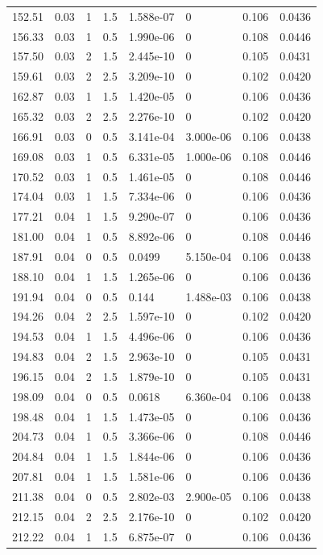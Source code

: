 \documentclass[preview]{standalone}
\begin{document}
{{{\begin{tabular}{L{1.2cm}C{1.2cm} C{0.3cm}C{0.5cm} C{1.4cm}C{1.4cm} C{1.4cm}C{1.4cm}}
  152.51  &  0.03  & 1     & 1.5 &  1.588e-07  & 0  & 0.106 &  0.0436   \\ 
  156.33  &  0.03  & 1     & 0.5 &  1.990e-06  & 0  & 0.108 &  0.0446   \\ 
  157.50  &  0.03  & 2     & 1.5 &  2.445e-10  & 0  & 0.105 &  0.0431   \\ 
  159.61  &  0.03  & 2     & 2.5 &  3.209e-10  & 0  & 0.102 &  0.0420   \\ 
  162.87  &  0.03  & 1     & 1.5 &  1.420e-05  & 0  & 0.106 &  0.0436   \\ 
  165.32  &  0.03  & 2     & 2.5 &  2.276e-10  & 0  & 0.102 &  0.0420   \\ 
  166.91  &  0.03  & 0     & 0.5 &  3.141e-04  & 3.000e-06  & 0.106 &  0.0438   \\ 
  169.08  &  0.03  & 1     & 0.5 &  6.331e-05  & 1.000e-06  & 0.108 &  0.0446   \\ 
  170.52  &  0.03  & 1     & 0.5 &  1.461e-05  & 0  & 0.108 &  0.0446   \\ 
  174.04  &  0.03  & 1     & 1.5 &  7.334e-06  & 0  & 0.106 &  0.0436   \\ 
  177.21  &  0.04  & 1     & 1.5 &  9.290e-07  & 0  & 0.106 &  0.0436   \\ 
  181.00  &  0.04  & 1     & 0.5 &  8.892e-06  & 0  & 0.108 &  0.0446   \\ 
  187.91  &  0.04  & 0     & 0.5 &  0.0499  & 5.150e-04  & 0.106 &  0.0438   \\ 
  188.10  &  0.04  & 1     & 1.5 &  1.265e-06  & 0  & 0.106 &  0.0436   \\ 
  191.94  &  0.04  & 0     & 0.5 &  0.144  & 1.488e-03  & 0.106 &  0.0438   \\ 
  194.26  &  0.04  & 2     & 2.5 &  1.597e-10  & 0  & 0.102 &  0.0420   \\ 
  194.53  &  0.04  & 1     & 1.5 &  4.496e-06  & 0  & 0.106 &  0.0436   \\ 
  194.83  &  0.04  & 2     & 1.5 &  2.963e-10  & 0  & 0.105 &  0.0431   \\ 
  196.15  &  0.04  & 2     & 1.5 &  1.879e-10  & 0  & 0.105 &  0.0431   \\ 
  198.09  &  0.04  & 0     & 0.5 &  0.0618  & 6.360e-04  & 0.106 &  0.0438   \\ 
  198.48  &  0.04  & 1     & 1.5 &  1.473e-05  & 0  & 0.106 &  0.0436   \\ 
  204.73  &  0.04  & 1     & 0.5 &  3.366e-06  & 0  & 0.108 &  0.0446   \\ 
  204.84  &  0.04  & 1     & 1.5 &  1.844e-06  & 0  & 0.106 &  0.0436   \\ 
  207.81  &  0.04  & 1     & 1.5 &  1.581e-06  & 0  & 0.106 &  0.0436   \\ 
  211.38  &  0.04  & 0     & 0.5 &  2.802e-03  & 2.900e-05  & 0.106 &  0.0438   \\ 
  212.15  &  0.04  & 2     & 2.5 &  2.176e-10  & 0  & 0.102 &  0.0420   \\ 
  212.22  &  0.04  & 1     & 1.5 &  6.875e-07  & 0  & 0.106 &  0.0436   \\ 
\hline 
\end{tabular} 

}}}
\end{document}
